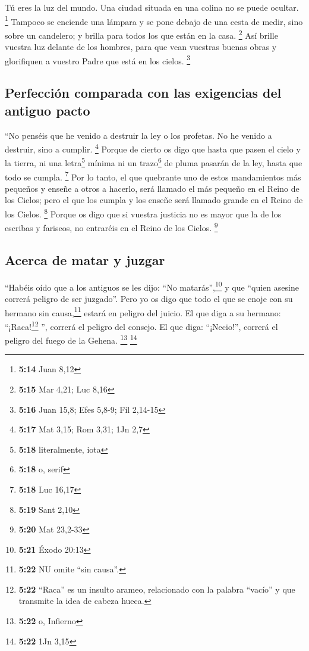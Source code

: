 \begin{paracol}{2}
 Tú eres la luz del mundo. Una ciudad situada en una
colina no se puede ocultar. \footnote{\textbf{5:14} Juan 8,12}
 Tampoco se enciende una lámpara y se pone debajo de una
cesta de medir, sino sobre un candelero; y brilla para todos los que
están en la casa. \footnote{\textbf{5:15} Mar 4,21; Luc 8,16}
 Así brille vuestra luz delante de los hombres, para que
vean vuestras buenas obras y glorifiquen a vuestro Padre que está en los
cielos. \footnote{\textbf{5:16} Juan 15,8; Efes 5,8-9; Fil 2,14-15}

\hypertarget{perfecciuxf3n-comparada-con-las-exigencias-del-antiguo-pacto}{%
\subsection{Perfección comparada con las exigencias del antiguo
pacto}\label{perfecciuxf3n-comparada-con-las-exigencias-del-antiguo-pacto}}

 ``No penséis que he venido a destruir la ley o los
profetas. No he venido a destruir, sino a cumplir. \footnote{\textbf{5:17}
  Mat 3,15; Rom 3,31; 1Jn 2,7}  Porque de cierto os digo
que hasta que pasen el cielo y la tierra, ni una letra\footnote{\textbf{5:18}
  literalmente, iota} mínima ni un trazo\footnote{\textbf{5:18} o, serif}
de pluma pasarán de la ley, hasta que todo se cumpla. \footnote{\textbf{5:18}
  Luc 16,17}  Por lo tanto, el que quebrante uno de estos
mandamientos más pequeños y enseñe a otros a hacerlo, será llamado el
más pequeño en el Reino de los Cielos; pero el que los cumpla y los
enseñe será llamado grande en el Reino de los Cielos. \footnote{\textbf{5:19}
  Sant 2,10}  Porque os digo que si vuestra justicia no
es mayor que la de los escribas y fariseos, no entraréis en el Reino de
los Cielos. \footnote{\textbf{5:20} Mat 23,2-33}

\hypertarget{acerca-de-matar-y-juzgar}{%
\subsection{Acerca de matar y juzgar}\label{acerca-de-matar-y-juzgar}}

 ``Habéis oído que a los antiguos se les dijo: ``No
matarás'',\footnote{\textbf{5:21} Éxodo 20:13} y que ``quien asesine
correrá peligro de ser juzgado''.  Pero yo os digo que
todo el que se enoje con su hermano sin causa,\footnote{\textbf{5:22} NU
  omite ``sin causa''.} estará en peligro del juicio. El que diga a su
hermano: ``¡Raca!\footnote{\textbf{5:22} ``Raca'' es un insulto arameo,
  relacionado con la palabra ``vacío'' y que transmite la idea de cabeza
  hueca.} '', correrá el peligro del consejo. El que diga: ``¡Necio!'',
correrá el peligro del fuego de la Gehena. \footnote{\textbf{5:22} o,
  Infierno} \footnote{\textbf{5:22} 1Jn 3,15}


\end{paracol}
